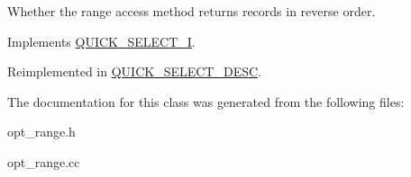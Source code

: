 Whether the range access method returns records in reverse order. 

Implements \mbox{\hyperlink{classQUICK__SELECT__I_a686e8770fe10ac41bafdcf6d0c74dff3}{Q\+U\+I\+C\+K\+\_\+\+S\+E\+L\+E\+C\+T\+\_\+I}}.



Reimplemented in \mbox{\hyperlink{classQUICK__SELECT__DESC_a1f9448b2def7b3aba93f9fbeee99a1cb}{Q\+U\+I\+C\+K\+\_\+\+S\+E\+L\+E\+C\+T\+\_\+\+D\+E\+SC}}.



The documentation for this class was generated from the following files\+:\begin{DoxyCompactItemize}
\item 
opt\+\_\+range.\+h\item 
opt\+\_\+range.\+cc\end{DoxyCompactItemize}
